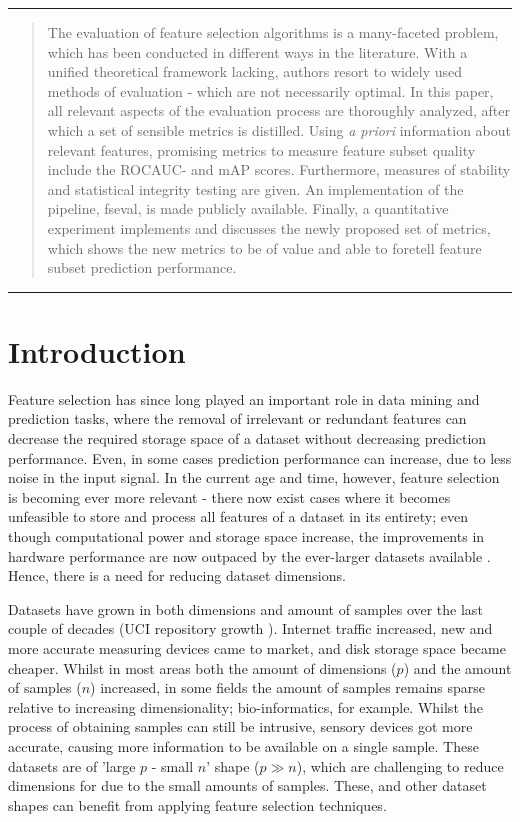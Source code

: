 \documentclass{article}
\begin{document}
\hrule
\begin{abstract}
The evaluation of feature selection algorithms is a many-faceted problem, which has been conducted in different ways in the literature. With a unified theoretical framework lacking, authors resort to widely used methods of evaluation - which are not necessarily optimal. In this paper, all relevant aspects of the evaluation process are thoroughly analyzed, after which a set of sensible metrics is distilled. Using \textit{a priori} information about relevant features, promising metrics to measure feature subset quality include the ROC\-AUC- and mAP scores. Furthermore, measures of stability and statistical integrity testing are given. An implementation of the pipeline, fseval, is made publicly available. Finally, a quantitative experiment implements and discusses the newly proposed set of metrics, which shows the new metrics to be of value and able to foretell feature subset prediction performance.
\end{abstract}
\hrule
\begin{quote}
    
\end{quote}

\section{Introduction}
Feature selection has since long played an important role in data mining and prediction tasks, where the removal of irrelevant or redundant features can decrease the required storage space of a dataset without decreasing prediction performance. Even, in some cases prediction performance can increase, due to less noise in the input signal. In the current age and time, however, feature selection is becoming ever more relevant - there now exist cases where it becomes unfeasible to store and process all features of a dataset in its entirety; even though computational power and storage space increase, the improvements in hardware performance are now outpaced by the ever-larger datasets available \citep{thomee2016yfcc100m}. Hence, there is a need for reducing dataset dimensions.

Datasets have grown in both dimensions and amount of samples over the last couple of decades (UCI repository growth \citep{alelyani2013feature}). Internet traffic increased, new and more accurate measuring devices came to market, and disk storage space became cheaper. Whilst in most areas both the amount of dimensions ($p$) and the amount of samples ($n$) increased, in some fields the amount of samples remains sparse relative to increasing dimensionality; bio-informatics, for example. Whilst the process of obtaining samples can still be intrusive, sensory devices got more accurate, causing more information to be available on a single sample. These datasets are of 'large $p$ - small $n$' shape ($p \gg n$), which are challenging to reduce dimensions for due to the small amounts of samples. These, and other dataset shapes can benefit from applying feature selection techniques. 
\end{document}
